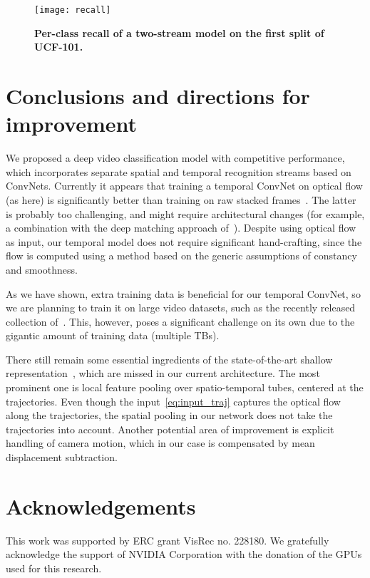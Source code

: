 \documentclass{article} \usepackage{nips14submit_e,times}
\begin{document}
\begin{figure}[htb]
\centering
\texttt{[image: recall]}
\caption{\textbf{Per-class recall of a two-stream model on the first split of UCF-101.} 
}
\label{fig:recall}
\end{figure}


\section{Conclusions and directions for improvement}
We proposed a deep video classification model with competitive performance,
which incorporates separate spatial and temporal recognition streams based on ConvNets.
Currently it appears that training a temporal ConvNet on optical flow
(as here) is significantly better than training on raw stacked
frames~\cite{Karpathy14}.  The latter is probably too challenging, and
might require architectural changes (for example, a combination with
the deep matching approach of~\cite{Weinzaepfel13}). Despite using
optical flow as input, our temporal model does not require significant
hand-crafting, since the flow is computed using a method based on the
generic assumptions of constancy and smoothness.

As we have shown, extra training data is beneficial for our temporal
ConvNet, so we are planning to train it on large video datasets,
such as the recently released collection of~\cite{Karpathy14}. This,
however, poses a significant challenge on its own due to the gigantic
amount of training data (multiple TBs).  


There still remain some essential ingredients of the state-of-the-art
shallow representation~\cite{Wang13b}, which are missed in our current
architecture.  The most prominent one is local feature pooling over
spatio-temporal tubes, centered at the trajectories. Even though the
input~\eqref{eq:input_traj} captures the optical flow along the
trajectories, the spatial pooling in our network does not take the
trajectories into account. Another potential area of improvement is
explicit handling of camera motion, which in our case is compensated
by mean displacement subtraction.

\section*{Acknowledgements}
This work was supported by ERC grant VisRec no. 228180. 
We gratefully acknowledge the support of NVIDIA Corporation with the donation of the GPUs used for this research.


{
    \small
    
}
\end{document}
